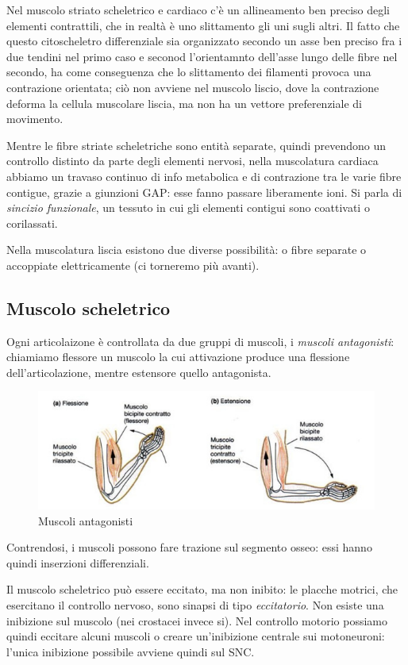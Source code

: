 \documentclass[a4paper,12pt]{article}
\begin{document}
Nel muscolo striato scheletrico e cardiaco c'è un allineamento ben preciso degli elementi contrattili, che in realtà è uno slittamento gli uni sugli altri. Il fatto che questo citoscheletro differenziale sia organizzato secondo un asse ben preciso fra i due tendini nel primo caso e seconod l'orientamnto dell'asse lungo delle fibre nel secondo, ha come conseguenza che  lo slittamento dei filamenti provoca una contrazione orientata; ciò non avviene nel muscolo liscio, dove la contrazione deforma la cellula muscolare liscia, ma non ha un vettore preferenziale di movimento.

Mentre le fibre striate scheletriche sono entità separate, quindi prevendono un controllo distinto da parte degli elementi nervosi, nella muscolatura cardiaca abbiamo un travaso continuo di info metabolica e di contrazione tra  le varie fibre contigue, grazie a giunzioni GAP: esse fanno passare liberamente ioni. Si parla di \emph{sincizio funzionale}, un tessuto in cui gli elementi contigui sono coattivati o corilassati.

Nella muscolatura liscia esistono due diverse possibilità: o fibre separate o accoppiate elettricamente (ci torneremo più avanti).

\subsection{Muscolo scheletrico}
Ogni articolaizone è controllata da due gruppi di muscoli, i \emph{muscoli antagonisti}: chiamiamo flessore un muscolo la cui attivazione produce una flessione dell'articolazione,  mentre estensore quello antagonista. 

\begin{figure}[H]
\centering
\includegraphics[scale=0.5]{immagine/antagonisti.jpg}
\caption{Muscoli antagonisti}
\end{figure}

Contrendosi, i muscoli possono fare trazione sul segmento osseo: essi hanno quindi inserzioni differenziali.

Il muscolo scheletrico può essere eccitato, ma non inibito: le placche motrici, che esercitano il controllo nervoso, sono sinapsi di tipo \emph{eccitatorio}. Non esiste una inibizione sul muscolo (nei crostacei invece si). Nel controllo motorio possiamo quindi eccitare alcuni muscoli o creare un'inibizione centrale sui motoneuroni: l'unica inibizione possibile avviene quindi sul SNC.
\end{document}
